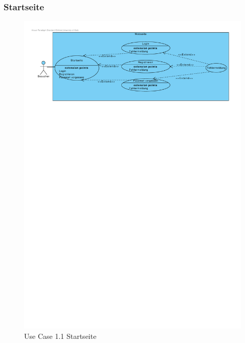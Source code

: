 \documentclass[10pt,a4paper]{article}
\begin{document}
\subsubsection{Startseite}
	\begin{figure}[h]
	  \includegraphics[width=\linewidth]{gfx/webseite/startseite.pdf}
          \caption{Use Case 1.1 Startseite}
	\end{figure}
\end{document}
